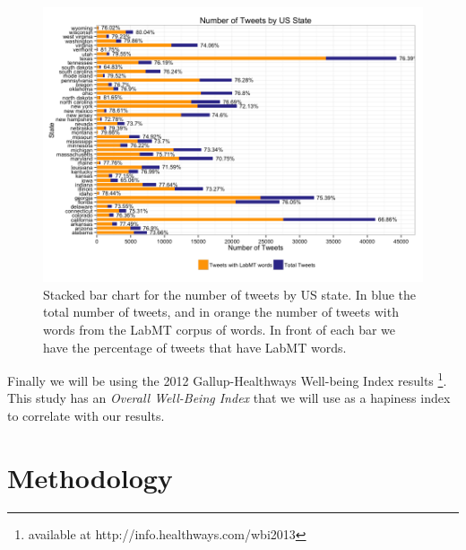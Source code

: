 \documentclass{llncs}
\begin{document}
\begin{figure}[!ht]
\centering
\includegraphics[width=\textwidth]{images/tweets_by_state}
\caption{Stacked bar chart for the number of tweets by US state. In blue the total number of tweets, and in orange the number of tweets with words from the LabMT corpus of words. In front of each bar we have the percentage of tweets that have LabMT words.}
\label{fig:tweets_by_state}
\end{figure}

Finally we will be using the 2012 Gallup-Healthways Well-being Index results \cite{GallupHealthway2013} \footnote{available at http://info.healthways.com/wbi2013}. This study has an \emph{Overall Well-Being Index} that we will use as a hapiness index to correlate with our results.

\section{Methodology}
\end{document}
